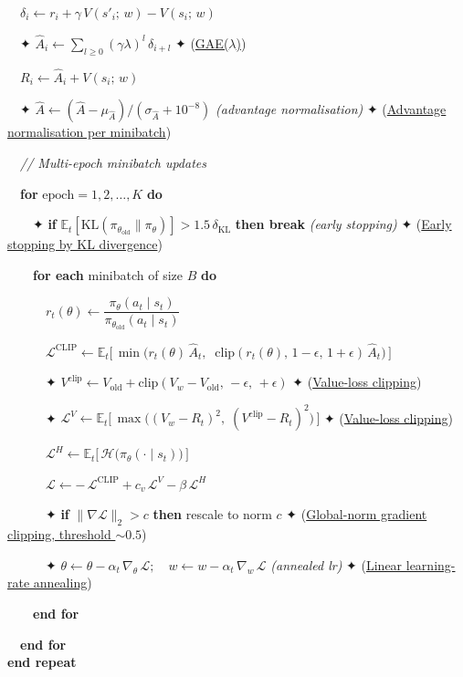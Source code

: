 \documentclass[11pt]{article}
\begin{document}
\begin{pseudobox}
\strut ~~\(\delta_i \leftarrow r_i + \gamma\, V(s'_i;\, w) - V(s_i;\, w)\)\\
\strut ~~✦
\(\hat{A}_i \leftarrow \sum_{l \geq 0}(\gamma\lambda)^l\, \delta_{i+l}\)
✦ (\hyperref[trick-4-7-1]{GAE(\(\lambda\))})\\
\strut ~~\(R_i \leftarrow \hat{A}_i + V(s_i;\, w)\)\\
\strut ~~✦
\(\hat{A} \leftarrow (\hat{A} - \mu_{\hat{A}})/(\sigma_{\hat{A}} + 10^{-8})\)
\emph{(advantage normalisation)} ✦ (\hyperref[trick-4-7-2]{Advantage
normalisation per minibatch})\\
\strut ~~\emph{// Multi-epoch minibatch updates}\\
\strut ~~\textbf{for} \(\text{epoch} = 1, 2, \ldots, K\) \textbf{do}\\
\strut ~~~~✦ \textbf{if}
\(\mathbb{E}_t[\mathrm{KL}(\pi_{\theta_\text{old}} \| \pi_\theta)] > 1.5\,\delta_\text{KL}\)
\textbf{then break} \emph{(early stopping)} ✦
(\hyperref[trick-4-7-8]{Early stopping by KL divergence})\\
\strut ~~~~\textbf{for each} minibatch of size \(B\) \textbf{do}\\
\strut ~~~~~~\(r_t(\theta) \leftarrow \dfrac{\pi_\theta(a_t \mid s_t)}{\pi_{\theta_{\text{old}}}(a_t \mid s_t)}\)\\
\strut ~~~~~~\(\mathcal{L}^{\text{CLIP}} \leftarrow \mathbb{E}_t\!\bigl[\, \min\!\bigl(r_t(\theta)\, \hat{A}_t,\;\; \mathrm{clip}(r_t(\theta),\, 1 - \epsilon,\, 1 + \epsilon)\, \hat{A}_t\bigr) \,\bigr]\)\\
\strut ~~~~~~✦
\(V^{\text{clip}} \leftarrow V_\text{old} + \mathrm{clip}(V_w - V_\text{old},\, -\epsilon,\, +\epsilon)\)
✦ (\hyperref[trick-4-7-3]{Value-loss clipping})\\
\strut ~~~~~~✦
\(\mathcal{L}^{V} \leftarrow \mathbb{E}_t\!\bigl[\, \max\!\bigl((V_w - R_t)^{2},\; (V^{\text{clip}} - R_t)^{2}\bigr) \,\bigr]\)
✦ (\hyperref[trick-4-7-3]{Value-loss clipping})\\
\strut ~~~~~~\(\mathcal{L}^{H} \leftarrow \mathbb{E}_t\!\bigl[\, \mathcal{H}\bigl(\pi_\theta(\cdot \mid s_t)\bigr) \,\bigr]\)\\
\strut ~~~~~~\(\mathcal{L} \leftarrow -\,\mathcal{L}^{\text{CLIP}} + c_v\, \mathcal{L}^{V} - \beta\, \mathcal{L}^{H}\)\\
\strut ~~~~~~✦ \textbf{if} \(\lVert\nabla\mathcal{L}\rVert_2 > c\)
\textbf{then} rescale to norm \(c\) ✦
(\hyperref[trick-4-7-4]{Global-norm gradient clipping, threshold
\(\sim 0.5\)})\\
\strut ~~~~~~✦
\(\theta \leftarrow \theta - \alpha_t\, \nabla_{\theta}\, \mathcal{L};\quad w \leftarrow w - \alpha_t\, \nabla_{w}\, \mathcal{L}\)
\emph{(annealed lr)} ✦ (\hyperref[trick-4-7-6]{Linear learning-rate
annealing})\\
\strut ~~~~\textbf{end for}\\
\strut ~~\textbf{end for}\\
\textbf{end repeat}

\end{pseudobox}
\end{document}
